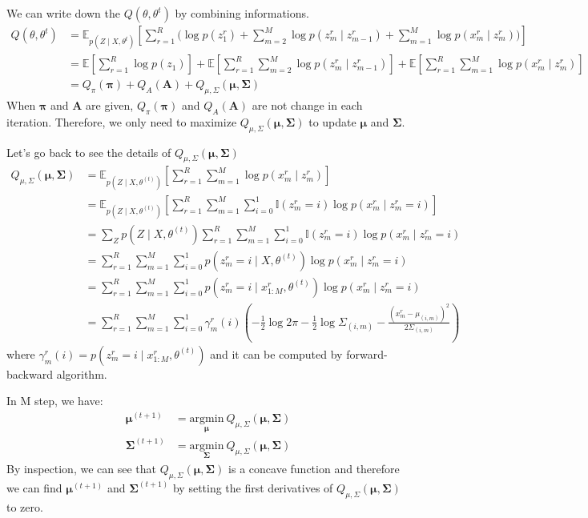 \documentclass[12pt]{article}
\newenvironment{problem}[2][Problem]{\begin{trivlist}
\item[\hskip \labelsep {\bfseries #1}\hskip \labelsep {\bfseries #2.}]}{\end{trivlist}}
\begin{document}
\begin{problem}{2.6.18}
We can write down the $Q(\theta, \theta^{t})$ by combining informations.
\begin{align*}
    Q(\theta, \theta^{t}) &= 
    \mathbb{E}_{p(Z\mid X, \theta^{t})}[ \sum_{r=1}^{R} \biggl(
        \log p(z^r_1) 
        + \sum_{m=2}^{M} \log p(z^r_m \mid z^r_{m-1}) 
        + \sum_{m=1}^{M} \log p(x^r_m\mid z^r_m)\biggl)] \\
    &= \mathbb{E}[\sum_{r=1}^{R} \log p(z_1)] 
        + \mathbb{E}[\sum_{r=1}^{R} \sum_{m=2}^{M} \log p(z^r_m \mid z^r_{m-1})] 
        + \mathbb{E}[\sum_{r=1}^{R} \sum_{m=1}^{M} \log p(x^r_m\mid z^r_m)] \\
    &= Q_{\pi}(\bm{\pi}) + Q_{A}(\bm{A}) + Q_{\mu, \Sigma}(\bm{\mu}, \bm{\Sigma})
\end{align*}
When $\bm{\pi}$ and $\bm{A}$ are given, $Q_{\pi}(\bm{\pi})$ and $Q_{A}(\bm{A})$ 
are not change in each iteration. Therefore, we only need to maximize 
$Q_{\mu, \Sigma}(\bm{\mu}, \bm{\Sigma})$ to update $\bm{\mu}$ and $\bm{\Sigma}$.

Let's go back to see the details of $Q_{\mu, \Sigma}(\bm{\mu}, \bm{\Sigma})$ 
\begin{align*}
    Q_{\mu, \Sigma}(\bm{\mu}, \bm{\Sigma}) 
    &= \mathbb{E}_{p(Z\mid X, \theta^{(t)})}[
            \sum_{r=1}^{R} \sum_{m=1}^{M} \log p(x^r_m\mid z^r_m)] \\
    &= \mathbb{E}_{p(Z\mid X, \theta^{(t)})}[
                \sum_{r=1}^{R} \sum_{m=1}^{M} \sum_{i=0}^{1} \mathbb{I}(z^r_m = i)\log p(x^r_m\mid z^r_m = i)] \\
    &= \sum_{Z} p(Z\mid X, \theta^{(t)})
            \sum_{r=1}^{R} \sum_{m=1}^{M} \sum_{i=0}^{1} \mathbb{I}(z^r_m = i)\log p(x^r_m\mid z^r_m = i) \\
    &= \sum_{r=1}^{R} \sum_{m=1}^{M} \sum_{i=0}^{1} p(z^r_m = i\mid X, \theta^{(t)})\log p(x^r_m\mid z^r_m = i) \\
    &= \sum_{r=1}^{R} \sum_{m=1}^{M} \sum_{i=0}^{1} p(z^r_m = i\mid x^{r}_{1:M}, \theta^{(t)})\log p(x^r_m\mid z^r_m = i) \\
    &= \sum_{r=1}^{R} \sum_{m=1}^{M} \sum_{i=0}^{1} \gamma^{r}_{m}(i)
        (-\frac{1}{2}\log 2\pi -\frac{1}{2}\log \Sigma_{(i,m)} - \frac{(x^r_m - \mu_{(i,m)})^2}{2\Sigma_{(i,m)}})
\end{align*}
where $\gamma^{r}_{m}(i) = p(z^r_m = i\mid x^{r}_{1:M}, \theta^{(t)})$ and it can be computed
by forward-backward algorithm.

In M step, we have:
\begin{align*}
    \bm{\mu}^{(t+1)} 
        &= \underset{\bm{\mu}}{\mathrm{argmin}} ~ Q_{\mu, \Sigma}(\bm{\mu}, \bm{\Sigma})  \\
    \bm{\Sigma}^{(t+1)} 
        &= \underset{\bm{\Sigma}}{\mathrm{argmin}} ~ Q_{\mu, \Sigma}(\bm{\mu}, \bm{\Sigma}) 
\end{align*}
By inspection, we can see that $Q_{\mu, \Sigma}(\bm{\mu}, \bm{\Sigma})$ 
is a concave function and therefore
we can find $\bm{\mu}^{(t+1)}$ and $\bm{\Sigma}^{(t+1)}$ 
by setting the first derivatives of $Q_{\mu, \Sigma}(\bm{\mu}, \bm{\Sigma})$
to zero.


\end{problem}
\end{document}
